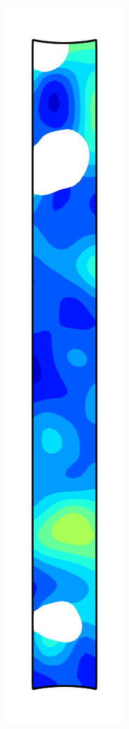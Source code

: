\begin{figure}[!htb]
\begin{subfigure}{0.08\textwidth}
  \end{subfigure}
  \begin{subfigure}{0.08\textwidth}
    \centering
    \includegraphics[width=\textwidth]{Chapter5/figures/spallation/psie_6}

\end{subfigure}
\end{figure}
